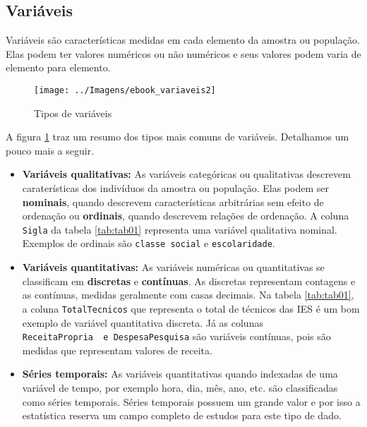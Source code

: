 \documentclass[11pt,]{style/krantz}
\theoremstyle{definition}
\theoremstyle{definition}
\theoremstyle{definition}
\theoremstyle{remark}
\begin{document}
\hypertarget{variaveis}{%
\subsection{Variáveis}\label{variaveis}}

Variáveis são características medidas em cada elemento da amostra ou população. Elas podem ter valores numéricos ou não numéricos e seus valores podem varia de elemento para elemento.

\begin{figure}[H]

{\centering \texttt{[image: ../Imagens/ebook\_variaveis2]}

}

\caption{Tipos de variáveis}\label{fig:fig06}
\end{figure}

A figura \ref{fig:fig06} traz um resumo dos tipos mais comuns de variáveis. Detalhamos um pouco mais a seguir.

\begin{itemize}
\item
  \textbf{Variáveis qualitativas:} As variáveis categóricas ou qualitativas descrevem caraterísticas dos indivíduos da amostra ou população. Elas podem ser \textbf{nominais}, quando descrevem características arbitrárias sem efeito de ordenação ou \textbf{ordinais}, quando descrevem relações de ordenação. A coluna \texttt{Sigla} da tabela \ref{tab:tab01} representa uma variável qualitativa nominal. Exemplos de ordinais são \texttt{classe\ social} e \texttt{escolaridade}.
\item
  \textbf{Variáveis quantitativas:} As variáveis numéricas ou quantitativas se classificam em \textbf{discretas} e \textbf{contínuas}. As discretas representam contagens e as contínuas, medidas geralmente com casas decimais. Na tabela \ref{tab:tab01}, a coluna \texttt{TotalTecnicos} que representa o total de técnicos das IES é um bom exemplo de variável quantitativa discreta. Já as colunas \texttt{ReceitaPropria\ \ e\ DespesaPesquisa} são variáveis contínuas, pois são medidas que representam valores de receita.
\item
  \textbf{Séries temporais:} As variáveis quantitativas quando indexadas de uma variável de tempo, por exemplo hora, dia, mês, ano, etc. são classificadas como séries temporais. Séries temporais possuem um grande valor e por isso a estatística reserva um campo completo de estudos para este tipo de dado.
\end{itemize}
\end{document}
